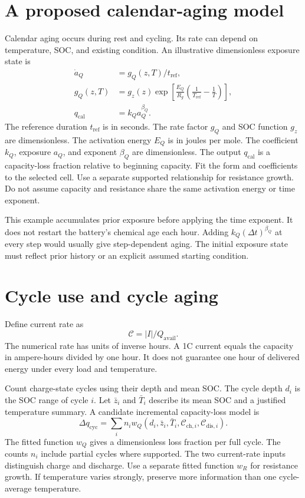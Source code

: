 \documentclass[11pt,a4paper]{report}
\begin{document}
\section{A proposed calendar-aging model}
Calendar aging occurs during rest and cycling.
Its rate can depend on temperature, SOC, and existing condition.
An illustrative dimensionless exposure state is
\begin{align}
\dot a_Q&=g_Q(z,T)/t_{\mathrm{ref}},\\
g_Q(z,T)&=g_z(z)
\exp\!\left[\frac{E_Q}{R_g}\left(\frac{1}{T_{\mathrm{ref}}}-\frac{1}{T}\right)\right],\\
q_{\mathrm{cal}}&=k_Q a_Q^{\beta_Q}.
\end{align}
The reference duration $t_{\mathrm{ref}}$ is in seconds.
The rate factor $g_Q$ and SOC function $g_z$ are dimensionless.
The activation energy $E_Q$ is in joules per mole.
The coefficient $k_Q$, exposure $a_Q$, and exponent $\beta_Q$ are dimensionless.
The output $q_{\mathrm{cal}}$ is a capacity-loss fraction relative to beginning capacity.
Fit the form and coefficients to the selected cell.
Use a separate supported relationship for resistance growth.
Do not assume capacity and resistance share the same activation energy or time exponent.

This example accumulates prior exposure before applying the time exponent.
It does not restart the battery's chemical age each hour.
Adding $k_Q(\Delta t)^{\beta_Q}$ at every step would usually give step-dependent aging.
The initial exposure state must reflect prior history or an explicit assumed starting condition.

\section{Cycle use and cycle aging}
Define current rate as
\begin{equation}
\mathcal{C}=|I|/Q_{\mathrm{avail}}.
\end{equation}
The numerical rate has units of inverse hours.
A 1C current equals the capacity in ampere-hours divided by one hour.
It does not guarantee one hour of delivered energy under every load and temperature.

Count charge-state cycles using their depth and mean SOC.
The cycle depth $d_i$ is the SOC range of cycle $i$.
Let $\bar z_i$ and $\bar T_i$ describe its mean SOC and a justified temperature summary.
A candidate incremental capacity-loss model is
\begin{equation}
\Delta q_{\mathrm{cyc}}=\sum_i n_i
w_Q(d_i,\bar z_i,\bar T_i,\mathcal{C}_{\mathrm{ch},i},\mathcal{C}_{\mathrm{dis},i}).
\end{equation}
The fitted function $w_Q$ gives a dimensionless loss fraction per full cycle.
The counts $n_i$ include partial cycles where supported.
The two current-rate inputs distinguish charge and discharge.
Use a separate fitted function $w_R$ for resistance growth.
If temperature varies strongly, preserve more information than one cycle-average temperature.
\end{document}

